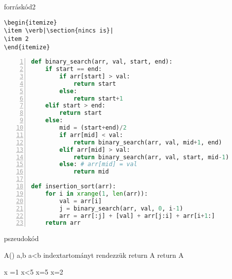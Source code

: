 \documentclass{article}
\theoremstyle{plain}
\theoremstyle{definition}
\theoremstyle{plain}
\theoremstyle{remark}
\begin{document}
\begin{forráskód} \caption{forráskód2}

\begin{verbatim}
\begin{itemize}
\item \verb|\section{nincs is}|
\item 2
\end{itemize}
\end{verbatim}
\end{forráskód}

\hulipsum[3-4]


\begin{lstlisting}[float=t,caption={keresések vagy mi},frame=Ltb,numbers=left,stepnumber=4,tabsize=2,language=python]
def binary_search(arr, val, start, end):
	if start == end:
		if arr[start] > val:
			return start
		else:
			return start+1
	elif start > end:
		return start
	else: 
		mid = (start+end)/2
		if arr[mid] < val:
			return binary_search(arr, val, mid+1, end)
		elif arr[mid] > val:
			return binary_search(arr, val, start, mid-1)
		else: # arr[mid] = val
			return mid
			
def insertion_sort(arr):
    for i in xrange(1, len(arr)):
        val = arr[i]
        j = binary_search(arr, val, 0, i-1)
        arr = arr[:j] + [val] + arr[j:i] + arr[i+1:]
    return arr
\end{lstlisting}


\begin{algorithm} \caption{pszeudokód}
\begin{algorithmic}[2]
\Require A()
\Require a,b
\State\Ensure a<b indextartományt rendezzük
\State return A
\Else
\State{}
\State{}
\State{}
\State return A
\EndIf
\EndProcedure
\end{algorithmic}
\end{algorithm}

\begin{algorithmic}
\Do
\State x =1
\While x<5
\Case x=5
\Case x=2

\end{algorithmic}
\end{document}
